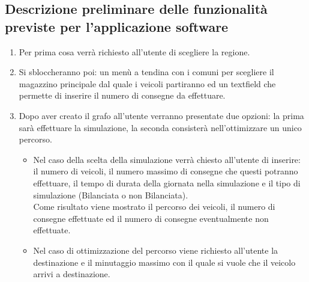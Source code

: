 \documentclass[a4paper,12pt]{report}
\begin{document}
\subsection*{Descrizione preliminare delle funzionalità previste per l’applicazione software}
\begin{enumerate}
\item Per prima cosa verrà richiesto all'utente di scegliere la regione.
\item Si sbloccheranno poi: un menù a tendina con i comuni per scegliere il magazzino principale dal quale i veicoli partiranno ed un textfield che permette di inserire il numero di consegne da effettuare.
\item Dopo aver creato il grafo all'utente verranno presentate due opzioni: la prima sarà effettuare la simulazione, la seconda consisterà nell'ottimizzare un unico percorso.
\begin{itemize}
\item Nel caso della scelta della simulazione verrà chiesto all'utente di inserire: il numero di veicoli, il numero massimo di consegne che questi potranno effettuare, il tempo di durata della giornata nella simulazione e il tipo di simulazione (Bilanciata o non Bilanciata).\\
Come risultato viene mostrato il percorso dei veicoli, il numero di consegne effettuate ed il numero di consegne eventualmente non effettuate.
\item Nel caso di ottimizzazione del percorso viene richiesto all'utente la destinazione e il minutaggio massimo con il quale si vuole che il veicolo arrivi a destinazione.
\end{itemize}
\end{enumerate}
\end{document}
